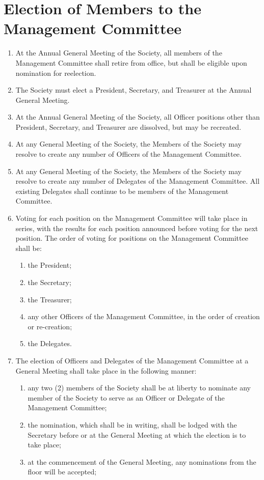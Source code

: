 \documentclass[a4paper]{article}
\newcommand*{\sectionr}[1]{{\raggedright \section{#1}}}
\begin{document}
\sectionr{Election of Members to the Management Committee}
\begin{enumerate}
\item At the Annual General Meeting of the Society, all members of the Management Committee shall retire from office, but shall be eligible upon nomination for re\textendash election.
\item The Society must elect a President, Secretary, and Treasurer at the Annual General Meeting.
\item At the Annual General Meeting of the Society, all Officer positions other than President, Secretary, and Treasurer are dissolved, but may be re\textendash created.
\item At any General Meeting of the Society, the Members of the Society may resolve to create any number of Officers of the Management Committee.
\item At any General Meeting  of the Society, the Members of the Society may resolve to create any number of Delegates of the Management Committee. All existing Delegates shall continue to be members of the Management Committee.
\item Voting for each position on the Management Committee will take place in series, with the results for each position announced before voting for the next position. The order of voting for positions on the Management Committee shall be:
	\begin{enumerate}
	\item the President;
	\item the Secretary;
	\item the Treasurer;
	\item any other Officers of the Management Committee, in the order of creation or re-creation;
	\item the Delegates.
	\end{enumerate}
\item The election of Officers and Delegates of the Management Committee at a General Meeting shall take place in the following manner:
	\begin{enumerate}
	\item any two (2) members of the Society shall be at liberty to nominate any member of the Society to serve as an Officer or Delegate of the Management Committee;
	\item the nomination, which shall be in writing, shall be lodged with the Secretary before or at the General Meeting at which the election is to take place;
	\item at the commencement of the General Meeting, any nominations from the floor will be accepted;

\end{enumerate}
\end{enumerate}
\end{document}

